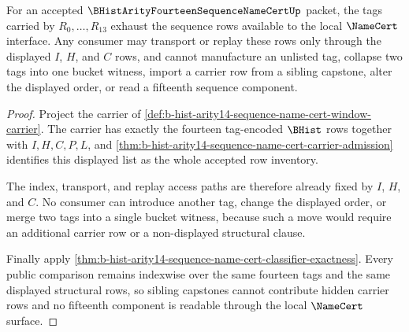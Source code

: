 \begin{theorem}
\label{thm:b-hist-arity14-sequence-name-cert-tag-exhaustion}
For an accepted $\BHistArityFourteenSequenceNameCertUp$ packet, the tags carried by $R_0,\ldots,R_{13}$ exhaust the sequence rows available to the local $\NameCert$ interface. Any consumer may transport or replay these rows only through the displayed $I$, $H$, and $C$ rows, and cannot manufacture an unlisted tag, collapse two tags into one bucket witness, import a carrier row from a sibling capstone, alter the displayed order, or read a fifteenth sequence component.
\end{theorem}
\begin{proof}
Project the carrier of \autoref{def:b-hist-arity14-sequence-name-cert-window-carrier}. The carrier has exactly the fourteen tag-encoded $\BHist$ rows together with $I,H,C,P,L$, and \autoref{thm:b-hist-arity14-sequence-name-cert-carrier-admission} identifies this displayed list as the whole accepted row inventory.

The index, transport, and replay access paths are therefore already fixed by $I$, $H$, and $C$. No consumer can introduce another tag, change the displayed order, or merge two tags into a single bucket witness, because such a move would require an additional carrier row or a non-displayed structural clause.

Finally apply \autoref{thm:b-hist-arity14-sequence-name-cert-classifier-exactness}. Every public comparison remains indexwise over the same fourteen tags and the same displayed structural rows, so sibling capstones cannot contribute hidden carrier rows and no fifteenth component is readable through the local $\NameCert$ surface.
\end{proof}

